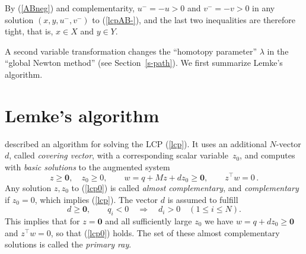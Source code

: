 \documentclass[a4paper,12pt]{article}  %
\theoremstyle{definition}
\newcommand{\T}{^{\top}}
\newcommand{\0}{{\mathbf0}}
\newcommand{\1}{{\mathbf1}}
\begin{document}
By (\ref{ABneg}) and complementarity, $u^-=-u>0$ and
$v^-=-v>0$ in any solution $(x,y,u^-,v^-)$ to
(\ref{lcpAB-}), and the last two inequalities are therefore
tight, that is, $x\in X$ and $y\in Y$. 

A second variable transformation changes the ``homotopy
parameter'' $\lambda$ in the ``global Newton method'' (see
Section~\ref{s-path}). 
We first summarize Lemke's algorithm.

\section{Lemke's algorithm}
\label{s-lemke}

\citet{Lemke1965} described an algorithm for solving the LCP
(\ref{lcp}).
It uses an additional $N$-vector $d$, called
\textit{covering vector}, with a corresponding scalar variable~$z_0$,
and computes with \textit{basic solutions} to the augmented system
\begin{equation}
\label{lcp0}
z\ge\0,\quad z_0\ge0,\qquad
w=q+Mz+dz_0\ge\0,\qquad
z\T w=0\,.
\end{equation}
Any solution $z,z_0$ to (\ref{lcp0}) is called
\textit{almost complementary}, and
\textit{complementary} if $z_0=0$, which implies (\ref{lcp}).
The vector $d$ is assumed to fulfill
\begin{equation}
\label{d}
d\ge\0,
\qquad
q_i<0\quad\Rightarrow\quad d_i>0
\quad
(1\le i\le N). 
\end{equation}
This implies that for $z=\0$ and all sufficiently large
$z_0$ we have $w = q + dz_0\ge\0$ and $z\T w = 0$, so that
(\ref{lcp0}) holds.
The set of these almost complementary solutions is called
the \textit{primary ray}.
\end{document}
